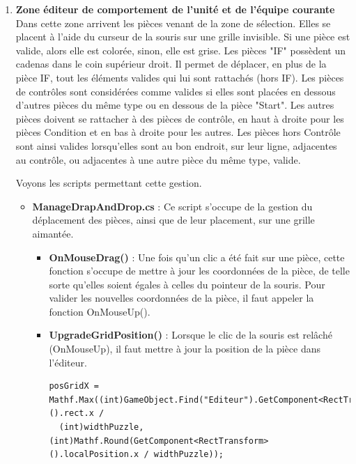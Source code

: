 \documentclass{report}
\begin{document}
\begin{enumerate}[label=\Alph*)]
\item\textbf{Zone éditeur de comportement de l'unité et de l'équipe courante} \newline
Dans cette zone arrivent les pièces venant de la zone de sélection. Elles se placent à l'aide du curseur de la souris sur une grille invisible. Si une pièce est valide, alors elle est colorée, sinon, elle est grise. Les pièces "IF" possèdent un cadenas dans le coin supérieur droit. Il permet de déplacer, en plus de la pièce IF, tout les éléments valides qui lui sont rattachés (hors IF). Les pièces de contrôles sont considérées comme valides si elles sont placées en dessous d'autres pièces du même type ou en dessous de la pièce "Start".\newline
Les autres pièces doivent se rattacher à des pièces de contrôle, en haut à droite pour les pièces Condition et en bas à droite pour les autres. Les pièces hors Contrôle sont ainsi valides lorsqu'elles sont au bon endroit, sur leur ligne, adjacentes au contrôle, ou adjacentes à une autre pièce du même type, valide. \newline \smallbreak

Voyons les scripts permettant cette gestion.

\begin{itemize}
\item\textbf{ManageDrapAndDrop.cs} : \newline 
Ce script s'occupe de la gestion du déplacement des pièces, ainsi que de leur placement, sur une grille aimantée.
\begin{itemize}
\item\textbf{OnMouseDrag()} : \newline
Une fois qu'un clic a été fait sur une pièce, cette fonction s'occupe de mettre à jour les coordonnées de la pièce, de telle sorte qu'elles soient égales à celles du pointeur de la souris. Pour valider les nouvelles coordonnées de la pièce, il faut appeler la fonction OnMouseUp().
\item\textbf{UpgradeGridPosition()} : \newline
Lorsque le clic de la souris est relâché (OnMouseUp), il faut mettre à jour la position de la pièce dans l'éditeur.
\begin{lstlisting}[frame=single]
posGridX = Mathf.Max((int)GameObject.Find("Editeur").GetComponent<RectTransform>().rect.x / 
  (int)widthPuzzle, (int)Mathf.Round(GetComponent<RectTransform>().localPosition.x / widthPuzzle));


\end{lstlisting}
\end{itemize}
\end{itemize}
\end{enumerate}
\end{document}
